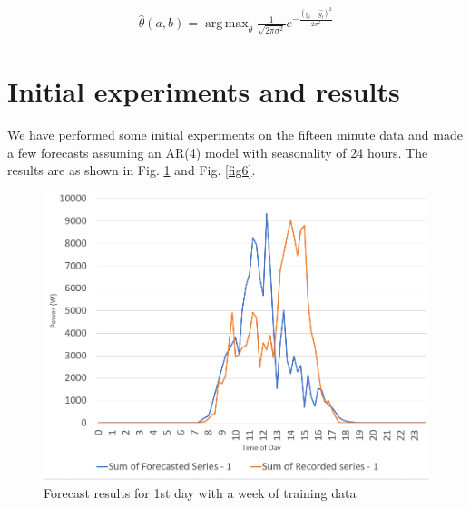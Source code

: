 \documentclass[journal]{IEEEtran}
\DeclareMathOperator*{\argmax}{arg\,max} %
\begin{document}
\begin{align*}
\widehat{\theta}(a,b)= \argmax_\theta \frac{1}{\sqrt{2\pi\sigma^{2}}} e^{-\frac{\left(y_{t}-\widehat{y_{t}} \right)^{2}}{2\sigma^{2}}}
\end{align*}


\section{Initial experiments and results}

We have performed some initial experiments on the fifteen minute data and made a few forecasts assuming an AR(4) model with seasonality of 24 hours. The results are as shown in Fig. \ref{fig5} and Fig. \ref{fig6}.

\begin{figure}[htpb]
	\centering
	\includegraphics[scale=0.35]{ForecastResultsOneWeek.png}
	\caption{Forecast results for 1st day with a week of training data}
	\label{fig5} %
\end{figure}
\end{document}
